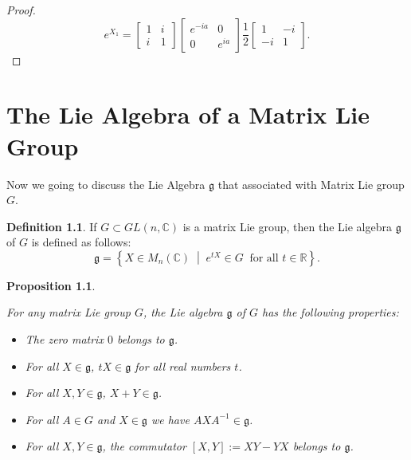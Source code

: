 \documentclass[
]{book}
\providecommand{\tightlist}{%
  \setlength{\itemsep}{0pt}\setlength{\parskip}{0pt}}
\newtheorem{proposition}{Proposition}[chapter]
\theoremstyle{definition}
\newtheorem{definition}{Definition}[chapter]
\theoremstyle{definition}
\theoremstyle{definition}
\theoremstyle{definition}
\theoremstyle{remark}
\begin{document}
\begin{proof}
\[e^{X_1} = 
\begin{bmatrix} 1 & i \\ i & 1 \end{bmatrix}
\begin{bmatrix} e^{-ia} & 0 \\ 0 & e^{ia} \end{bmatrix}
\frac{1}{2}
\begin{bmatrix} 1 & -i \\ -i & 1 \end{bmatrix}.\]
\end{proof}

\chapter{The Lie Algebra of a Matrix Lie Group}\label{the-lie-algebra-of-a-matrix-lie-group}

Now we going to discuss the Lie Algebra \(\mathfrak{g}\) that associated with Matrix Lie group \(G\).

\begin{definition}
\protect\hypertarget{def:unnamed-chunk-19}{}\label{def:unnamed-chunk-19}If \(G \subset GL(n, \mathbb{C})\) is a matrix Lie group, then the Lie algebra \(\mathfrak{g}\) of \(G\) is defined as follows:
\[
\mathfrak{g} = \left\{ X \in M_n(\mathbb{C}) \;\middle|\; e^{tX} \in G \;\; \text{for all } t \in \mathbb{R} \right\}.
\]
\end{definition}

\begin{proposition}
\protect\hypertarget{prp:unnamed-chunk-20}{}\label{prp:unnamed-chunk-20}

For any matrix Lie group \(G\), the Lie algebra \(\mathfrak{g}\) of \(G\) has the following properties:

\begin{itemize}
\tightlist
\item
  The zero matrix \(0\) belongs to \(\mathfrak{g}\).
\item
  For all \(X \in \mathfrak{g}\), \(tX \in \mathfrak{g}\) for all real numbers \(t\).
\item
  For all \(X, Y \in \mathfrak{g}\), \(X + Y \in \mathfrak{g}\).
\item
  For all \(A \in G\) and \(X \in \mathfrak{g}\) we have \(AXA^{-1} \in \mathfrak{g}\).
\item
  For all \(X, Y \in \mathfrak{g}\), the commutator \([X, Y] := XY - YX\) belongs to \(\mathfrak{g}\).
\end{itemize}

\end{proposition}
\end{document}
